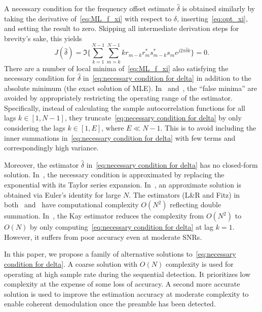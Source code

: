 A necessary condition for the frequency offset estimate $\hat{\delta}$
is obtained similarly by taking the derivative of~\eqref{eq:ML_f_xi} with respect to
$\delta$, inserting~\eqref{eq:opt_xi}, and setting the result to
zero.
Skipping all intermediate derivation steps for brevity's sake, this yields
\begin{equation}
  \label{eq:necessary condition for delta}
  J(\hat{\delta}) = \Im\bigg\{\sum_{k=1}^{N-1}{\sum_{m=k}^{N-1}{kr_{m-k}r_m^{*}s_{m-k}^{*}s_m}e^{j2\pi\hat{\delta}k}}\bigg\}=0.
\end{equation}
There are a number of local minima of~\eqref{eq:ML_f_xi} also satisfying
the necessary condition for $\hat{\delta}$ in~\eqref{eq:necessary condition for delta}
in addition to the absolute minimum (the exact solution of MLE).
In~\cite{Luise_Reggiannini_95} and~\cite{Fitz_94}, the ``false minima'' are avoided
by appropriately restricting the operating range of the estimator.
Specifically,
instead of calculating the sample autocorrelation functions for all
lags $k\in[1,N-1]$, 
they truncate~\eqref{eq:necessary condition for delta} by only considering the lags $k{\in}[1,E]$,
where $E \ll N{-}1$.
This is to avoid 
including the inner summations in~\eqref{eq:necessary condition for delta} with few
terms and correspondingly high variance.

Moreover, the estimator $\hat{\delta}$ in~\eqref{eq:necessary condition for delta} has no closed-form solution.
In~\cite{Luise_Reggiannini_95}, the necessary condition is
approximated by replacing the exponential with its Taylor series
expansion. 
In~\cite{Fitz_94}, an approximate solution is obtained via Euler's identity for large $N$.
The estimators (L\&R and Fitz) in both~\cite{Luise_Reggiannini_95} and~\cite{Fitz_94}  have computational complexity $O(N^2)$ 
reflecting double summation.
In~\cite{kay_89}, the Kay estimator reduces the complexity from $O(N^2)$
to $O(N)$ by only
computing~\eqref{eq:necessary condition for delta} at lag $k=1$.
However, it suffers from poor accuracy even at moderate SNRs.

In this paper, we propose a family of alternative solutions to~\eqref{eq:necessary condition for delta}.
A coarse solution with $O(N)$ complexity is used for operating at high sample rate during the sequential detection.
It prioritizes low complexity at the expense of some loss of
accuracy.
A second more accurate solution is used to improve
the estimation accuracy at moderate complexity to enable coherent demodulation once the preamble has been detected. 


